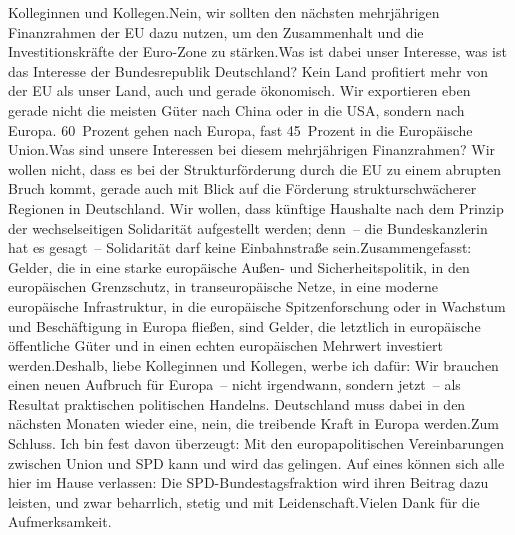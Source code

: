 \documentclass{article}
\begin{document}
Kolleginnen und Kollegen.Nein, wir sollten den nächsten mehrjährigen Finanzrahmen der EU dazu nutzen, um den Zusammenhalt und die Investitionskräfte der Euro-Zone zu stärken.Was ist dabei unser Interesse, was ist das Interesse der Bundesrepublik Deutschland? Kein Land profitiert mehr von der EU als unser Land, auch und gerade ökonomisch. Wir exportieren eben gerade nicht die meisten Güter nach China oder in die USA, sondern nach Europa. 60 Prozent gehen nach Europa, fast 45 Prozent in die Europäische Union.Was sind unsere Interessen bei diesem mehrjährigen Finanzrahmen? Wir wollen nicht, dass es bei der Strukturförderung durch die EU zu einem abrupten Bruch kommt, gerade auch mit Blick auf die Förderung strukturschwächerer Regionen in Deutschland. Wir wollen, dass künftige Haushalte nach dem Prinzip der wechselseitigen Solidarität aufgestellt werden; denn – die Bundeskanzlerin hat es gesagt – Solidarität darf keine Einbahnstraße sein.Zusammengefasst: Gelder, die in eine starke europäische Außen- und Sicherheitspolitik, in den europäischen Grenzschutz, in transeuropäische Netze, in eine moderne europäische Infrastruktur, in die europäische Spitzenforschung oder in Wachstum und Beschäftigung in Europa fließen, sind Gelder, die letztlich in europäische öffentliche Güter und in einen echten europäischen Mehrwert investiert werden.Deshalb, liebe Kolleginnen und Kollegen, werbe ich dafür: Wir brauchen einen neuen Aufbruch für Europa – nicht irgendwann, sondern jetzt – als Resultat praktischen politischen Handelns. Deutschland muss dabei in den nächsten Monaten wieder eine, nein, die treibende Kraft in Europa werden.Zum Schluss. Ich bin fest davon überzeugt: Mit den europapolitischen Vereinbarungen zwischen Union und SPD kann und wird das gelingen. Auf eines können sich alle hier im Hause verlassen: Die SPD-Bundestagsfraktion wird ihren Beitrag dazu leisten, und zwar beharrlich, stetig und mit Leidenschaft.Vielen Dank für die Aufmerksamkeit.
\end{document}
